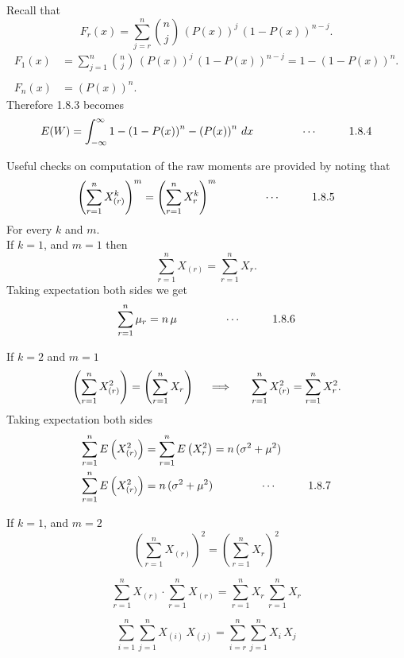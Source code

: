 \documentclass[12pt,a4paper]{report}
\theoremstyle{definition}
\theoremstyle{plain}
\begin{document}
Recall that
$$ F_r(x)   = \sum^n_{j = r} \binom{n}{j}\, \left(P(x)\right)^j\, \left(1  - P(x)\right)^{n - j}.$$
\begin{align*}
F_1(x) & = \sum^n_{j  = 1} \binom{n}{j}\, \left(P(x)\right)^j\, \left(1  - P(x)\right)^{n - j} = 1 - \left(1 - P(x)\right)^{n}.\\\\
F_n(x) & = \left(P(x)\right)^n.
\end{align*}
Therefore 1.8.3 becomes
$$E(W)  = \int^{\infty}_{-\infty} 1 - \left(1 - P(x)\right)^n - \left(P(x)\right)^n\, dx\hspace{1.5cm}\cdots\hspace{1cm} 1.8.4$$


Useful checks on computation of the raw moments are provided by noting that 
$$\left(\sum_{r = 1}^nX^k_{(r)}\right)^m = \left(\sum_{r = 1}^nX^k_r\right)^m\hspace{1.5cm} \cdots \hspace{1cm} 1.8.5$$
For every $k$ and $m$.\\

If $k = 1$, and $m = 1$ then $$\sum^n_{r =1}X_{(r)} = \sum^n_{r = 1}X_r.$$
Taking expectation both sides we get $$\sum^n_{r = 1} \mu_r = n\, \mu\hspace{1.5cm} \cdots\hspace{1cm} 1.8.6$$

If $k  = 2$ and $m = 1$
$$\left(\sum^n_{r = 1} X^2_{(r)}\right) = \left(\sum^n_{r = 1}X_r\right)\hspace{0.4cm}\implies\hspace{0.5cm} \sum^n_{r = 1} X_{(r)}^2 = \sum^n_{r = 1}X_r^2.$$
Taking expectation both sides
\begin{align*}
\sum^n_{r = 1}E\left(X^2_{(r)}\right) & = \sum^n_{r = 1} E\left(X^2_r\right) = n\, (\sigma^2 + \mu^2)\\
\sum^n_{r = 1}E\left(X^2_{(r)}\right) & = n\, (\sigma^2 + \mu^2)\hspace{1.5cm} \cdots\hspace{1cm} 1.8.7
\end{align*}


If $k  = 1$, and $m = 2$
$$\left(\sum^n_{r = 1} X_{(r)}\right)^2 = \left(\sum^n_{r = 1}X_r\right)^2$$

$$\sum^n_{r = 1}X_{(r)}\cdot\sum^n_{r  = 1} X_{(r)} = \sum^n_{r = 1} X_r \, \sum^n_{r = 1} X_r$$

$$\sum^n_{i = 1}\sum^n_{j = 1} X_{(i)}\, X_{(j)} = \sum^n_{i = r}\sum^n_{j = 1}X_i\, X_j$$
\end{document}
